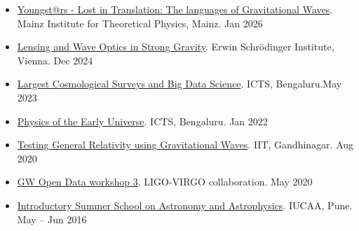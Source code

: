 \begin{itemize}

    \item \href{https://indico.mitp.uni-mainz.de/event/464/overview}{Youngst@rs - Lost in Translation: The languages of Gravitational Waves}. Mainz Institute for Theoretical Physics, Mainz. \hfill{Jan 2026}
    
     
    \item \href{https://www.esi.ac.at/events/e546/}{Lensing and Wave Optics in Strong Gravity}. Erwin Schr\"odinger Institute, Vienna. \hfill{Dec 2024}
    
    
    
    \item \href{https://icts.res.in/program/BigDataCosmo}{Largest Cosmological Surveys and Big Data Science}. ICTS, Bengaluru.\hfill{May 2023}

    
    \item \href{https://www.icts.res.in/program/peu2022}{Physics of the Early Universe}. ICTS, Bengaluru. \hfill{Jan 2022}
    
    
    \item \href{https://events.iitgn.ac.in/2020/TGRGW/}{Testing General Relativity using Gravitational Waves}. IIT, Gandhinagar. \hfill{Aug 2020}
    
    
    \item \href{https://www.gw-openscience.org/static/workshop3/}{GW Open Data workshop 3}. LIGO-VIRGO collaboration. \hfill{May 2020}
    
    \item \href{https://drive.google.com/file/d/1NXjGtc22BN5WcFA2DzjdyrPXi6D74dE-/view?usp=sharing}{Introductory Summer School on Astronomy and Astrophysics}. IUCAA, Pune. \hfill{May -- Jun 2016}
    
\end{itemize}